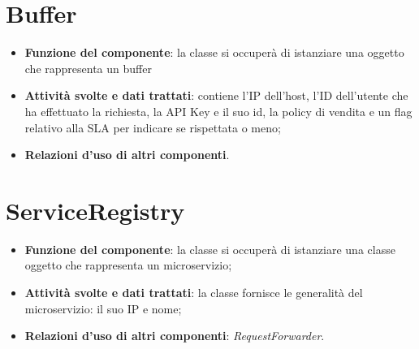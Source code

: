 \chapter{Buffer}
\begin{itemize}
	\item \textbf{Funzione del componente}: la classe si occuper\`{a} di istanziare una oggetto che rappresenta un buffer 
	\item \textbf{Attivit\`{a} svolte e dati trattati}: contiene l'IP dell'host, l'ID dell'utente che ha effettuato la richiesta, la API Key e il suo id, la policy di vendita e un flag relativo alla SLA per indicare se rispettata o meno;
	\item \textbf{Relazioni d'uso di altri componenti}.
\end{itemize}

\chapter{ServiceRegistry}
\begin{itemize}
	\item \textbf{Funzione del componente}: la classe si occuper\`{a} di istanziare una classe oggetto che rappresenta un microservizio;
	\item \textbf{Attivit\`{a} svolte e dati trattati}: la classe fornisce le generalit\`{a} del microservizio: il suo IP e nome;
	\item \textbf{Relazioni d'uso di altri componenti}: \textit{RequestForwarder}.
\end{itemize}





